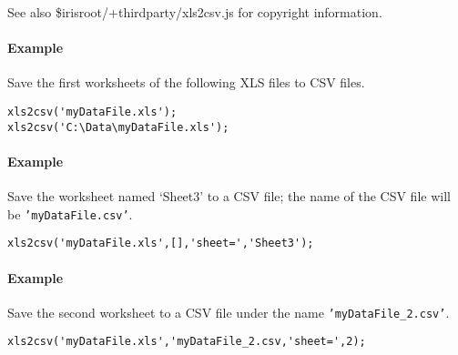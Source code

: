 See also \$irisroot/+thirdparty/xls2csv.js for copyright information.

\paragraph{Example}\label{example}

Save the first worksheets of the following XLS files to CSV files.

\begin{verbatim}
xls2csv('myDataFile.xls');
xls2csv('C:\Data\myDataFile.xls');
\end{verbatim}

\paragraph{Example}\label{example-1}

Save the worksheet named `Sheet3' to a CSV file; the name of the CSV
file will be \texttt{'myDataFile.csv'}.

\begin{verbatim}
xls2csv('myDataFile.xls',[],'sheet=','Sheet3');
\end{verbatim}

\paragraph{Example}\label{example-2}

Save the second worksheet to a CSV file under the name
\texttt{'myDataFile\_2.csv'}.

\begin{verbatim}
xls2csv('myDataFile.xls','myDataFile_2.csv,'sheet=',2);
\end{verbatim}


